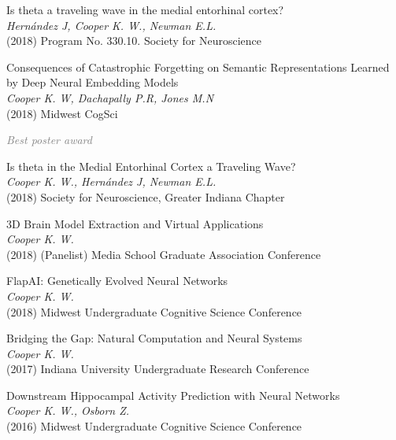 \documentclass[10pt]{cooperCV2}
\begin{document}
\begin{etaremune}[itemindent=-\bibhang, topsep=0pt,
				   itemsep=\bibsep,partopsep=0pt,parsep=0pt,leftmargin={\bibhang+\widthof{[999]}}]
	
    \item Is theta a traveling wave in the medial entorhinal cortex? \\
     \textit{Hernández J, Cooper K. W., Newman E.L.}\\
     (2018) Program No. 330.10. Society for Neuroscience
     
	
    \item Consequences of Catastrophic Forgetting on Semantic Representations Learned by Deep Neural Embedding Models \\
     \textit{Cooper K. W, Dachapally P.R, Jones M.N}\\
     (2018) Midwest CogSci
     
     	\begin{innerlist}
     	
	     \item  \textcolor{grey}{\textit{Best poster award} }
     	
     	\end{innerlist}
     
	
    \item Is theta in the Medial Entorhinal Cortex a Traveling Wave? \\
     \textit{Cooper K. W., Hernández J, Newman E.L.}\\
     (2018) Society for Neuroscience, Greater Indiana Chapter
     
	
    \item 3D Brain Model Extraction and Virtual Applications \\
     \textit{Cooper K. W.}\\
     (2018) (Panelist) Media School Graduate Association Conference
     
	
    \item FlapAI: Genetically Evolved Neural Networks \\
     \textit{Cooper K. W.}\\
     (2018) Midwest Undergraduate Cognitive Science Conference
     
	
    \item Bridging the Gap: Natural Computation and Neural Systems \\
     \textit{Cooper K. W.}\\
     (2017) Indiana University Undergraduate Research Conference
     
	
    \item Downstream Hippocampal Activity Prediction with Neural Networks \\
     \textit{Cooper K. W., Osborn Z.}\\
     (2016) Midwest Undergraduate Cognitive Science Conference
     
	


\end{etaremune}
\end{document}
